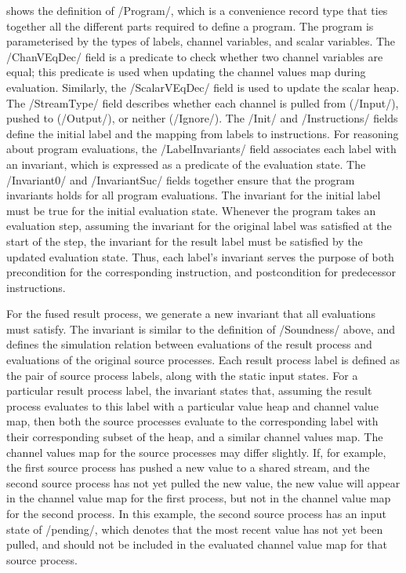  shows the definition of \Hs/Program/, which is a convenience record type that ties together all the different parts required to define a program.
The program is parameterised by the types of labels, channel variables, and scalar variables.
The \Hs/ChanVEqDec/ field is a predicate to check whether two channel variables are equal; this predicate is used when updating the channel values map during evaluation.
Similarly, the \Hs/ScalarVEqDec/ field is used to update the scalar heap.
The \Hs/StreamType/ field describes whether each channel is pulled from (\Hs/Input/), pushed to (\Hs/Output/), or neither (\Hs/Ignore/).
The \Hs/Init/ and \Hs/Instructions/ fields define the initial label and the mapping from labels to instructions.
For reasoning about program evaluations, the \Hs/LabelInvariants/ field associates each label with an invariant, which is expressed as a predicate of the evaluation state.
The \Hs/Invariant0/ and \Hs/InvariantSuc/ fields together ensure that the program invariants holds for all program evaluations.
The invariant for the initial label must be true for the initial evaluation state.
Whenever the program takes an evaluation step, assuming the invariant for the original label was satisfied at the start of the step, the invariant for the result label must be satisfied by the updated evaluation state.
Thus, each label's invariant serves the purpose of both precondition for the corresponding instruction, and postcondition for predecessor instructions.


For the fused result process, we generate a new invariant that all evaluations must satisfy.
The invariant is similar to the definition of \Hs/Soundness/ above, and defines the simulation relation between evaluations of the result process and evaluations of the original source processes.
Each result process label is defined as the pair of source process labels, along with the static input states.
For a particular result process label, the invariant states that, assuming the result process evaluates to this label with a particular value heap and channel value map, then both the source processes evaluate to the corresponding label with their corresponding subset of the heap, and a similar channel values map.
The channel values map for the source processes may differ slightly.
If, for example, the first source process has pushed a new value to a shared stream, and the second source process has not yet pulled the new value, the new value will appear in the channel value map for the first process, but not in the channel value map for the second process.
In this example, the second source process has an input state of \Hs/pending/, which denotes that the most recent value has not yet been pulled, and should not be included in the evaluated channel value map for that source process.

